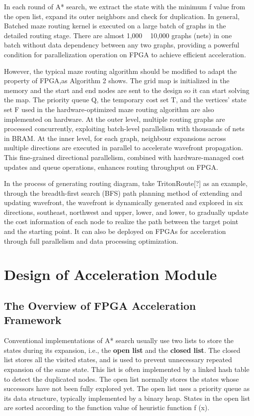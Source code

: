 \documentclass[conference]{IEEEtran}
\begin{document}
In each round of A* search, we extract the state with the minimum f value from the open list, expand its outer neighbors and check for duplication.
In general, Batched maze routing kernel is executed on a large batch of graphs in the detailed routing stage. There are almost 1,000 ~ 10,000 graphs (nets) in one batch without data dependency between any two graphs, providing a powerful condition for parallelization operation on FPGA to achieve efficient acceleration.

However, the typical maze routing algorithm should be modified to adapt the property of FPGA,as Algorithm 2 shows.
The grid map is initialized in the memory and the start and end nodes are sent to the design so it can start solving the map.
The priority queue Q, the temporary cost set T, and the vertices' state set F used in the hardware-optimized maze routing algorithm are also implemented on hardware.
At the outer level, multiple routing graphs are processed concurrently, exploiting batch-level parallelism with thousands of nets in BRAM.
At the inner level, for each graph, neighbour expansions across multiple directions are executed in parallel to accelerate wavefront propagation.
This fine-grained directional parallelism, combined with hardware-managed cost updates and queue operations, enhances routing throughput on FPGA.

In the process of generating routing diagram, take TritonRoute[?] as an example, through the breadth-first search (BFS) path planning method of extending and updating wavefront, 
the wavefront is dynamically generated and explored in six directions, southeast, northwest and upper, lower, and lower, to gradually update the cost information of each node to realize the path between the target point and the starting point.
It can also be deployed on FPGAs for acceleration through full parallelism and data processing optimization.
\section{Design of Acceleration Module}
\subsection{The Overview of FPGA Acceleration Framework}
Conventional implementations of A* search usually use two lists to store the states during its expansion, i.e., the \textbf{open list} and the \textbf{closed list}. 
The closed list stores all the visited states, and is used to prevent unnecessary repeated expansion of the same state. This list is often implemented by a linked hash table to detect the duplicated nodes. 
The open list normally stores the states whose successors have not been fully explored yet. The open list uses a priority queue as its data structure, typically implemented by a binary heap. 
States in the open list are sorted according to the function value of heuristic function f (x).
\end{document}
